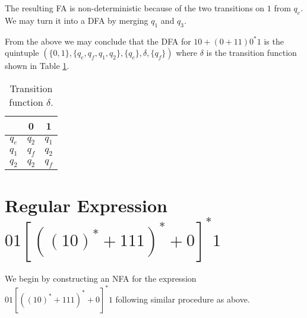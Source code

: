 \documentclass[a4paper, 12pt]{article}
\begin{document}
The resulting FA is non-deterministic because of the two transitions on $1$ from
$q_e$. We may turn it into a DFA by merging $q_1$ and $q_3$.

\begin{center}
\end{center}

From the above we may conclude that the DFA for $10 + (0 + 11) 0^{*} 1$ is the
quintuple $(\{0, 1\}, \{q_e, q_f, q_1, q_2\}, \{q_e\}, \delta, \{q_f\})$
where $\delta$ is the transition function shown in Table \ref{tab:delta_1}.

\begin{table}[H]
\centering
\begin{tabular}{@{}ccc@{}}
\toprule
      & 0     & 1     \\ \midrule
$q_e$ & $q_2$ & $q_1$ \\ \midrule
$q_1$ & $q_f$ & $q_2$ \\ \midrule
$q_2$ & $q_2$ & $q_f$ \\ \bottomrule
\end{tabular}
\caption{Transition function $\delta$.}
\label{tab:delta_1}
\end{table}

\section{Regular Expression $01[((10)^* + 111)^* + 0]^*1$}

We begin by constructing an NFA for the expression $01[((10)^* + 111)^* + 0]^*1$
following similar procedure as above.
\end{document}

